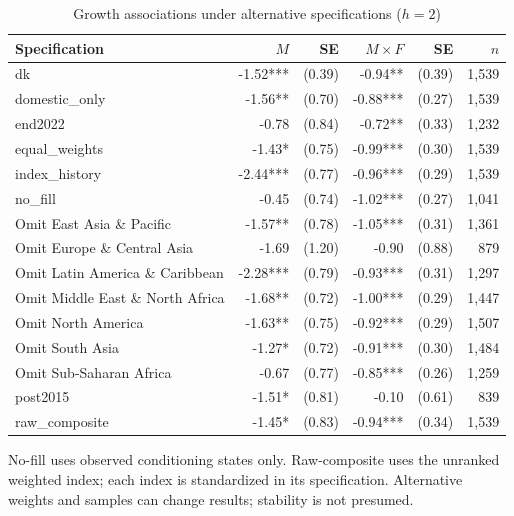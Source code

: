 \begin{table}[!htbp]
\centering\small
\caption{Growth associations under alternative specifications ($h=2$)}\label{tab:robustness}
\begin{tabular}{lrrrrr}\toprule
Specification & $M$ & SE & $M\times F$ & SE & $n$ \\
\midrule
dk & -1.52*** & (0.39) & -0.94** & (0.39) & 1,539 \\
domestic\_only & -1.56** & (0.70) & -0.88*** & (0.27) & 1,539 \\
end2022 & -0.78 & (0.84) & -0.72** & (0.33) & 1,232 \\
equal\_weights & -1.43* & (0.75) & -0.99*** & (0.30) & 1,539 \\
index\_history & -2.44*** & (0.77) & -0.96*** & (0.29) & 1,539 \\
no\_fill & -0.45 & (0.74) & -1.02*** & (0.27) & 1,041 \\
Omit East Asia \& Pacific & -1.57** & (0.78) & -1.05*** & (0.31) & 1,361 \\
Omit Europe \& Central Asia & -1.69 & (1.20) & -0.90 & (0.88) & 879 \\
Omit Latin America \& Caribbean & -2.28*** & (0.79) & -0.93*** & (0.31) & 1,297 \\
Omit Middle East \& North Africa & -1.68** & (0.72) & -1.00*** & (0.29) & 1,447 \\
Omit North America & -1.63** & (0.75) & -0.92*** & (0.29) & 1,507 \\
Omit South Asia & -1.27* & (0.72) & -0.91*** & (0.30) & 1,484 \\
Omit Sub-Saharan Africa & -0.67 & (0.77) & -0.85*** & (0.26) & 1,259 \\
post2015 & -1.51* & (0.81) & -0.10 & (0.61) & 839 \\
raw\_composite & -1.45* & (0.83) & -0.94*** & (0.34) & 1,539 \\
\bottomrule\end{tabular}
\par\smallskip\begin{minipage}{0.98\linewidth}\footnotesize No-fill uses observed conditioning states only. Raw-composite uses the unranked weighted index; each index is standardized in its specification. Alternative weights and samples can change results; stability is not presumed.\end{minipage}
\end{table}
